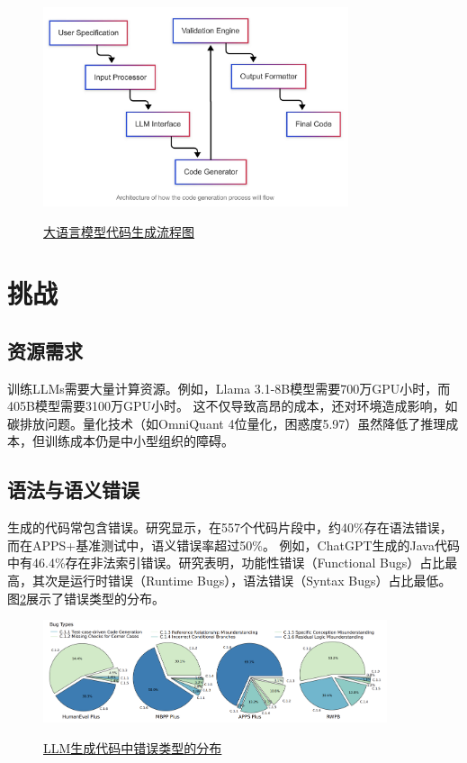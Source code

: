 \documentclass[11pt]{article}
\begin{document}
\begin{figure}[H]
    \centering
    \href{https://mskadu.medium.com/generating-code-with-llms-a-developers-guide-part-1-0c381dc3e57a}{%
        \includegraphics[width=0.8\textwidth]{code_generation_flowchart.png}%
    }
    \caption{\href{https://mskadu.medium.com/generating-code-with-llms-a-developers-guide-part-1-0c381dc3e57a}{大语言模型代码生成流程图}}
    \label{fig:flowchart}
\end{figure}

\section{挑战}
\subsection{资源需求}
训练LLMs需要大量计算资源。例如，Llama 3.1-8B模型需要700万GPU小时，而405B模型需要3100万GPU小时。%
这不仅导致高昂的成本，还对环境造成影响，如碳排放问题。量化技术（如OmniQuant 4位量化，困惑度5.97）虽然降低了推理成本，但训练成本仍是中小型组织的障碍。

\subsection{语法与语义错误}
生成的代码常包含错误。研究显示，在557个代码片段中，约40\%存在语法错误，而在APPS+基准测试中，语义错误率超过50\%。%
例如，ChatGPT生成的Java代码中有46.4\%存在非法索引错误。研究表明，功能性错误（Functional Bugs）占比最高，其次是运行时错误（Runtime Bugs），语法错误（Syntax Bugs）占比最低。图\ref{fig:error_types}展示了错误类型的分布。

\begin{figure}[H]
    \centering
    \href{https://arxiv.org/pdf/2407.06153}{%
        \includegraphics[width=0.9\textwidth]{error_types_pie.png}%
    }
    \caption{\href{https://arxiv.org/pdf/2407.06153}{LLM生成代码中错误类型的分布}}
    \label{fig:error_types}
\end{figure}
\end{document}
